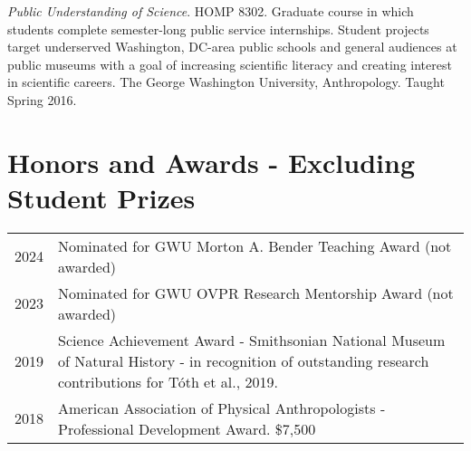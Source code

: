 \documentclass{article}
\newenvironment{mylist}
{\begin{description}[style=unboxed,leftmargin=1.3cm]}
{\end{description}}
\begin{document}
\begin{mylist}
\item[] \emph{Public Understanding of Science}. HOMP 8302.  Graduate course in which students complete semester-long public service internships. Student projects target underserved Washington, DC-area public schools and general audiences at public museums with a goal of increasing scientific literacy and creating interest in scientific careers. The George Washington University, Anthropology. Taught Spring 2016.



\end{mylist}



\section*{Honors and Awards - Excluding Student Prizes}

\begin{tabular}{p{}p{}}
2024 & Nominated for GWU Morton A. Bender Teaching Award (not awarded)\\[4pt]
2023 & Nominated for GWU OVPR Research Mentorship Award (not awarded)\\[4pt]
2019 & Science Achievement Award - Smithsonian National Museum of Natural History - in recognition of outstanding research contributions for Tóth et al., 2019.\\[4pt]
2018 & American Association of Physical Anthropologists - Professional Development Award. \$7,500\\[4pt]
\end{tabular}
\end{document}
